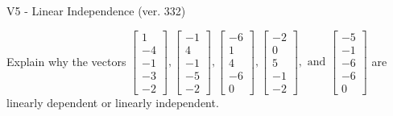 \begin{exercise}
  \begin{exerciseTitle}V5 - Linear Independence (ver. 332)\end{exerciseTitle}
  \begin{exerciseStatement}
    Explain why the vectors \(\left[\begin{array}{r}
1 \\
-4 \\
-1 \\
-3 \\
-2
\end{array}\right] , \left[\begin{array}{r}
-1 \\
4 \\
-1 \\
-5 \\
-2
\end{array}\right] , \left[\begin{array}{r}
-6 \\
1 \\
4 \\
-6 \\
0
\end{array}\right] , \left[\begin{array}{r}
-2 \\
0 \\
5 \\
-1 \\
-2
\end{array}\right] , \text{ and } \left[\begin{array}{r}
-5 \\
-1 \\
-6 \\
-6 \\
0
\end{array}\right]\) are linearly dependent or linearly independent.	



\end{exerciseStatement}
\end{exercise}

